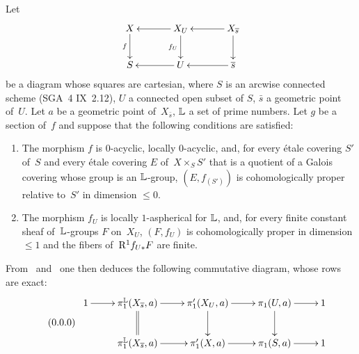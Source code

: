 \subsection{}
\label{XIII.4.7} Let
$$
\xymatrix@C=1.2cm{
X \ar[d]_-f&\ar[l] X_U \ar[d]_-{f_U}& \ar[l]X_{\bar{s}}\ar[d] \\
S&\ar[l] U &\ar[l]\bar{s}
}
$$
be a
diagram whose squares are cartesian, where $S$ is an
arcwise connected scheme (SGA~4 IX~2.12), $U$ a connected open subset of
$S$, $\bar{s}$ a geometric point of~$U$. Let $a$ be a
geometric point of~$X_{\bar{s}}$, $\mathbb{L}$ a set of
prime numbers. Let $g$ be a section of~$f$ and suppose that the
following conditions are satisfied:
\begin{enumerate}
\item[a)] The morphism $f$ is $0$-acyclic, locally $0$-acyclic,
and, for every \'etale covering $S'$ of~$S$ and every
\'etale covering $E$ of~$X\times_S S'$ that is a quotient of a
Galois covering whose group is an $\mathbb{L}$-group, $(E,f_{(S')})$ is
cohomologically proper relative to~$S'$ in dimension $\leq
0$.
\item[b)] The morphism $f_U$ is locally $1$-aspherical for
$\mathbb{L}$, and, for every finite constant sheaf of~$\mathbb{L}$-groups $F$ on~$X_U$, $(F,f_U)$ is cohomologically proper in dimension $\leq 1$ and
the fibers of~$\mathrm{R}^1 f_{U*}F$ are finite.
\end{enumerate}

From~ and~ one then deduces the following
commutative diagram, whose rows are exact:
\begin{equation*}
\label{eq:XIII.4.7.0} \tag{\thesubsection.0} {}
\begin{array}{c}
\xymatrix{
1 \ar[r]& \pi_1^{\LL}(X_{\bar{s}},a) \ar[r]\ar@{=}[d]& \pi'_1(X_U,a) \ar[r]\ar[d]& \pi_1(U,a)\ar[r]\ar[d]& 1 \\
&\pi_1^{\LL}(X_{\bar{s}},a) \ar[r]&\pi'_1(X,a) \ar[r]& \pi_1(S,a) \ar[r]& 1
}
\end{array}
\end{equation*}

